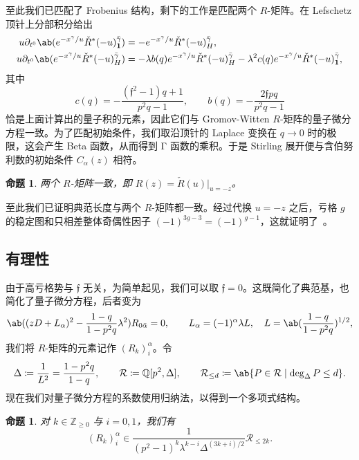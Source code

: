 \documentclass{amsart}
\newtheorem{prop}[thm]{命题}
\theoremstyle{definition}
\theoremstyle{remark}
\theoremstyle{plain}
\theoremstyle{definition}
\theoremstyle{remark}
\newcommand{\Z}{\mathbb{Z}}
\newcommand{\Q}{\mathbb{Q}}
\newcommand{\mc}[1]{\mathcal{#1}}
\newcommand{\mf}[1]{\mathfrak{#1}}
\newcommand{\1}{\mathbf{1}}
\newcommand{\2}{\mathbf{2}}
\newcommand{\3}{\mathbf{3}}
\begin{document}
至此我们已匹配了 Frobenius 结构，剩下的工作是匹配两个 \(R\)-矩阵。在 Lefschetz 顶针上分部积分给出
\begin{align*}
    u \partial_{t^0}\ab(e^{-x^{\gamma}/u}\check{R}^*(-u)^{\bar{\gamma}}_{\1}) &= -e^{-x^{\gamma}/u}\check{R}^*(-u)^{\bar{\gamma}}_H, \\
    u\partial_{t^0}\ab(e^{-x^{\gamma}/u}\check{R}^*(-u)^{\bar{\gamma}}_H) &= -\lambda b(q)e^{-x^{\gamma}/u}\check{R}^*(-u)^{\bar{\gamma}}_H - \lambda^2 c(q) e^{-x^{\gamma}/u}\check{R}^*(-u)^{\bar{\gamma}}_{\1},
\end{align*}
其中
\[ c(q) = -\frac{(\mf{f}^2-1)q+1}{p^2q-1}, \qquad b(q) = -\frac{2\mf{f}pq}{p^2q-1} \]
恰是上面计算出的量子积的元素，因此它们与 Gromov-Witten \(R\)-矩阵的量子微分方程一致。为了匹配初始条件，我们取沿顶针的 Laplace 变换在 \(q \to 0\) 时的极限，这会产生 Beta 函数，从而得到 Γ 函数的乘积。于是 Stirling 展开便与含伯努利数的初始条件 \(C_{\alpha}(z)\) 相符。

\begin{prop}%
\label{prop:R matrices coincide}
    两个 \(R\)-矩阵一致，即 \(R(z) = \check{R}(u)|_{u=-z}\)。
\end{prop}

至此我们已证明典范长度与两个 \(R\)-矩阵都一致。经过代换 \(u = -z\) 之后，亏格 \(g\) 的稳定图和只相差整体奇偶性因子 \((-1)^{3g-3} = (-1)^{g-1}\)，这就证明了~。

\subsection{有理性}%
\label{sub:Rationality}

由于高亏格势与 \(\mf{f}\) 无关，为简单起见，我们可以取 \(\mf{f} = 0\)。这既简化了典范基，也简化了量子微分方程，后者变为
\[ \ab((zD+L_{\alpha})^2 - \frac{1-q}{1-p^2q}\lambda^2)R_{0\bar{\alpha}} = 0, \qquad L_{\alpha} = (-1)^{\alpha}\lambda L, \quad L = \ab(\frac{1-q}{1-p^2q})^{1/2}, \]
我们将 \(R\)-矩阵的元素记作 \((R_k)_i^{\alpha}\)。令
\[ \Delta \coloneqq \frac{1}{L^2} = \frac{1-p^2q}{1-q}, \qquad \mc{R} \coloneqq \Q[p^2,\Delta], \qquad \mc{R}_{\leq d} \coloneqq \ab\{P \in \mc{R} \mid \deg_{\Delta} P \leq d\}. \]
现在我们对量子微分方程的系数使用归纳法，以得到一个多项式结构。

\begin{prop}%
\label{prop:R matrix polynomiality}
    对 \(k \in \Z_{\geq0}\) 与 \(i = 0,1\)，我们有
    \[ (R_k)_i^{\alpha} \in \frac{1}{(p^2-1)^k \lambda^{k-i}\Delta^{(3k+i)/2}}\mc{R}_{\leq 2k}. \]
\end{prop}
\end{document}
